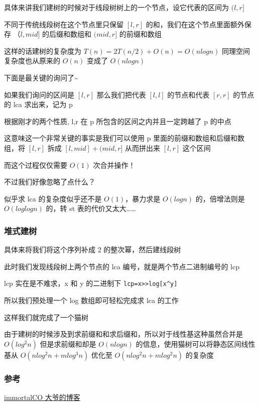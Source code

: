 具体来讲我们建树的时候对于线段树树上的一个节点，设它代表的区间为 $(l,r]$

不同于传统线段树在这个节点里只保留 $[l,r]$ 的和，我们在这个节点里面额外保存 $（l,mid]$ 的后缀和数组和 $(mid,r]$ 的前缀和数组

这样的话建树的复杂度为 $T(n)=2T(n/2)+O(n)=O(nlogn)$ 同理空间复杂度也从原来的 $O(n)$ 变成了 $O(nlogn)$

下面是最关键的询问了\textasciitilde{}

如果我们询问的区间是 $[l,r]$ 那么我们把代表 $[l,l]$ 的节点和代表 $[r,r]$ 的节点的 lca 求出来，记为 p

根据刚才的两个性质, l,r 在 p 所包含的区间之内并且一定跨越了 p 的中点

这意味这一个非常关键的事实是我们可以使用 p 里面的前缀和数组和后缀和数组，将 $[l,r]$ 拆成 $[l,mid]+(mid,r]$ 从而拼出来 $[l,r]$ 这个区间

而这个过程仅仅需要 $O(1)$ 次合并操作！

不过我们好像忽略了点什么？

似乎求 lca 的复杂度似乎还不是 $O(1)$，暴力求是 $O(logn)$ 的，倍增法则是 $O(loglogn)$ 的，转 st 表的代价又太大……

\subsubsection{堆式建树}

具体来将我们将这个序列补成 2 的整次幂，然后建线段树

此时我们发现线段树上两个节点的 lca 编号，就是两个节点二进制编号的 lcp

lcp 实在是不难求，x 和 y 的二进制下 \texttt{lcp=x>>log[x\textasciicircum{}y]}

所以我们预处理一个 log 数组即可轻松完成求 lca 的工作

这样我们就完成了一个猫树

由于建树的时候涉及到求前缀和和求后缀和，所以对于线性基这种虽然合并是 $O(log^2n)$ 但是求前缀和却是 $O(nlogn)$ 的信息，使用猫树可以将静态区间线性基从 $O(nlog^2n+mlog^3n)$ 优化至 $O(nlog^2n+mlog^2n)$ 的复杂度

\subsubsection{参考}

\href{http://immortalco.blog.uoj.ac/blog/2102}{immortalCO 大爷的博客}
